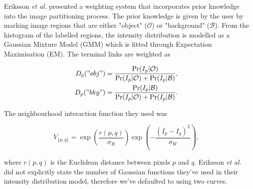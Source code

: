\begin{definition}
	Eriksson \textit{et al.} \citep{Eriksson2006} presented a weighting system that incorporates prior knowledge into the image partitioning process. The prior knowledge is given by the user by marking image regions that are either "object" ($\mathcal{O}$) or "background" ($\mathcal{B}$). From the histogram of the labelled regions, the intensity distribution is modelled as a Gaussian Mixture Model (GMM) which is fitted through Expectation Maximisation (EM). The terminal links are weighted as
	
\begin{align}
	D_p("obj") &= \frac{\Pr(I_p|\mathcal{O})}{\Pr(I_p|\mathcal{O})+\Pr(I_p|\mathcal{B})}, \\
	D_p("bkg") &= \frac{\Pr(I_p|\mathcal{B})}{\Pr(I_p|\mathcal{O})+\Pr(I_p|\mathcal{B})}.
\end{align}

The neighbourhood interaction function they used was
	
\begin{equation}
	V_{\{p,q\}} = \exp\left( \frac{r(p,q)}{\sigma_R} \right)\exp\left( -\frac{(I_p-I_q)^2}{\sigma_W} \right),
\end{equation}
	
where $r(p,q)$ is the Euclidean distance between pixels $p$ and $q$. Eriksson \textit{et al.} did not explicitly state the number of Gaussian functions they've used in their intensity distribution model, therefore we've defaulted to using two curves.
\end{definition}


